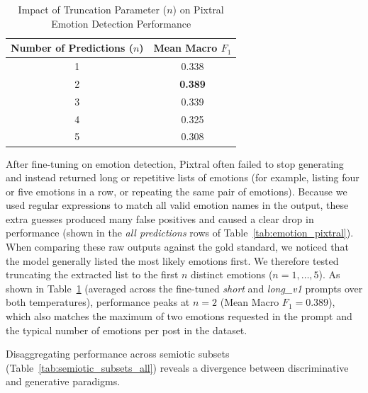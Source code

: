 \begin{table}[!t]
\centering
\caption{Impact of Truncation Parameter ($n$) on Pixtral Emotion Detection Performance}
\label{table:truncation_parameter}
\footnotesize
\begin{tabular}{c c}
\hline
\textbf{Number of Predictions ($n$)} & \textbf{Mean Macro $F_1$} \\
\hline
1 & 0.338 \\
2 & \textbf{0.389} \\
3 & 0.339 \\
4 & 0.325 \\
5 & 0.308 \\
\hline
\end{tabular}
\end{table}

After fine-tuning on emotion detection, Pixtral often failed to stop generating and instead returned long or repetitive lists of emotions (for example, listing four or five emotions in a row, or repeating the same pair of emotions). Because we used regular expressions to match all valid emotion names in the output, these extra guesses produced many false positives and caused a clear drop in performance (shown in the \textit{all predictions} rows of Table~\ref{tab:emotion_pixtral}). When comparing these raw outputs against the gold standard, we noticed that the model generally listed the most likely emotions first. We therefore tested truncating the extracted list to the first $n$ distinct emotions ($n = 1, \dots, 5$). As shown in Table~\ref{table:truncation_parameter} (averaged across the fine-tuned \textit{short} and \textit{long\_v1} prompts over both temperatures), performance peaks at $n=2$ (Mean Macro $F_1 = 0.389$), which also matches the maximum of two emotions requested in the prompt and the typical number of emotions per post in the dataset.

Disaggregating performance across semiotic subsets (Table~\ref{tab:semiotic_subsets_all}) reveals a divergence between discriminative and generative paradigms.

